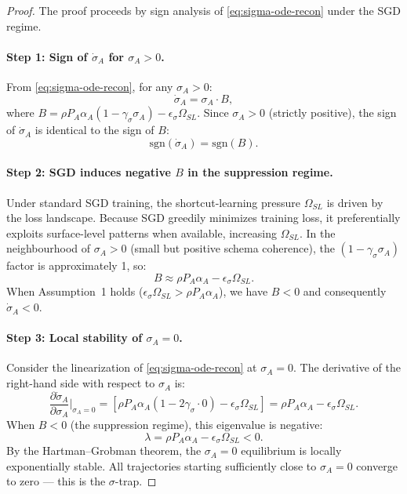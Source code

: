 \begin{proof}
The proof proceeds by sign analysis of \eqref{eq:sigma-ode-recon}
under the SGD regime.

\paragraph{Step 1: Sign of $\dot{\sigma}_A$ for $\sigma_A > 0$.}
From \eqref{eq:sigma-ode-recon}, for any $\sigma_A > 0$:
\[
\dot{\sigma}_A = \sigma_A \cdot B,
\]
where $B = \rho P_A \alpha_A (1 - \gamma_\sigma \sigma_A) - \epsilon_\sigma \Omega_{SL}$.
Since $\sigma_A > 0$ (strictly positive), the sign of $\dot{\sigma}_A$
is identical to the sign of $B$:
\[
\text{sgn}(\dot{\sigma}_A) = \text{sgn}(B).
\]

\paragraph{Step 2: SGD induces negative $B$ in the suppression regime.}
Under standard SGD training, the shortcut-learning pressure
$\Omega_{SL}$ is driven by the loss landscape. Because SGD greedily
minimizes training loss, it preferentially exploits surface-level
patterns when available, increasing $\Omega_{SL}$. In the
neighbourhood of $\sigma_A > 0$ (small but positive schema coherence),
the $(1 - \gamma_\sigma \sigma_A)$ factor is approximately 1, so:
\[
B \approx \rho P_A \alpha_A - \epsilon_\sigma \Omega_{SL}.
\]
When Assumption~1 holds ($\epsilon_\sigma \Omega_{SL} > \rho P_A \alpha_A$),
we have $B < 0$ and consequently $\dot{\sigma}_A < 0$.

\paragraph{Step 3: Local stability of $\sigma_A = 0$.}
Consider the linearization of \eqref{eq:sigma-ode-recon} at
$\sigma_A = 0$. The derivative of the right-hand side with respect
to $\sigma_A$ is:
\[
\frac{\partial \dot{\sigma}_A}{\partial \sigma_A}\bigg|_{\sigma_A = 0}
= [\rho P_A \alpha_A (1 - 2\gamma_\sigma \cdot 0) - \epsilon_\sigma \Omega_{SL}]
= \rho P_A \alpha_A - \epsilon_\sigma \Omega_{SL}.
\]
When $B < 0$ (the suppression regime), this eigenvalue is negative:
\[
\lambda = \rho P_A \alpha_A - \epsilon_\sigma \Omega_{SL} < 0.
\]
By the Hartman--Grobman theorem, the $\sigma_A = 0$ equilibrium is
locally exponentially stable. All trajectories starting sufficiently
close to $\sigma_A = 0$ converge to zero — this is the $\sigma$-trap.


\end{proof}

